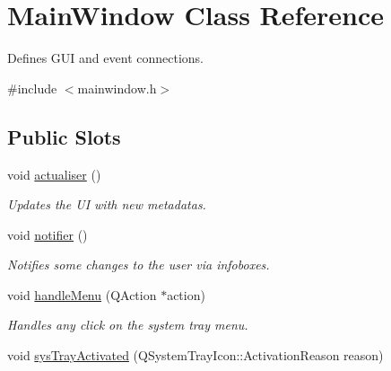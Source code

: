 \hypertarget{classMainWindow}{
\section{MainWindow Class Reference}
\label{classMainWindow}
}


Defines GUI and event connections.  




{\ttfamily \#include $<$mainwindow.h$>$}

\subsection*{Public Slots}
\begin{DoxyCompactItemize}
\item 
\hypertarget{classMainWindow_ac27375193e08c1c27374dc54aa845c43}{
void \hyperlink{classMainWindow_ac27375193e08c1c27374dc54aa845c43}{actualiser} ()}
\label{classMainWindow_ac27375193e08c1c27374dc54aa845c43}

\begin{DoxyCompactList}\small\item\em Updates the UI with new metadatas. \item\end{DoxyCompactList}\item 
\hypertarget{classMainWindow_aec45df853658993c9cc393ea0272faed}{
void \hyperlink{classMainWindow_aec45df853658993c9cc393ea0272faed}{notifier} ()}
\label{classMainWindow_aec45df853658993c9cc393ea0272faed}

\begin{DoxyCompactList}\small\item\em Notifies some changes to the user via infoboxes. \item\end{DoxyCompactList}\item 
\hypertarget{classMainWindow_a845df12d0fa7833da6a281e0387b8ba1}{
void \hyperlink{classMainWindow_a845df12d0fa7833da6a281e0387b8ba1}{handleMenu} (QAction $\ast$action)}
\label{classMainWindow_a845df12d0fa7833da6a281e0387b8ba1}

\begin{DoxyCompactList}\small\item\em Handles any click on the system tray menu. \item\end{DoxyCompactList}\item 
\hypertarget{classMainWindow_ab15d68a7738568bfd423a375738ceed2}{
void \hyperlink{classMainWindow_ab15d68a7738568bfd423a375738ceed2}{sysTrayActivated} (QSystemTrayIcon::ActivationReason reason)}
\label{classMainWindow_ab15d68a7738568bfd423a375738ceed2}


\end{DoxyCompactItemize}
